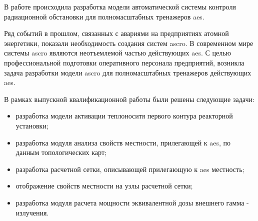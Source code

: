 
В работе происходила разработка модели автоматической системы контроля радиационной обстановки для полномасштабных 
тренажеров \ac{aes}. 

Ряд событий в прошлом, связанных с авариями на предприятиях атомной энергетики, показали необходимость создания систем 
\ac{ascro}. В современном мире системы \ac{ascro} являются неотъемлемой частью действующих \ac{aes}. С целью 
профессиональной подготовки оперативного персонала предприятий, возникла задача разработки модели 
\ac{ascro} для полномасштабных тренажеров действующих \ac{aes}.

В рамках выпускной квалификационной работы были решены следующие задачи:

\begin{itemize}
  \item разработка модели активации теплоноситя первого контура реакторной установки;
  \item разработка модуля анализа свойств местности, прилегающей к \ac{aes}, по данным топологических карт;
  \item разработка расчетной сетки, описывающей прилегающую к \ac{aes} местность;
  \item отображение свойств местности на узлы расчетной сетки;
  \item разработка модуля расчета мощности эквивалентной дозы внешнего гамма - излучения.
\end{itemize}
